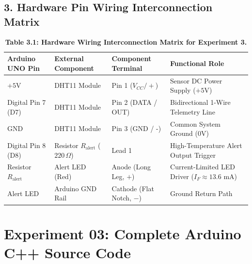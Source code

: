 \documentclass[10pt,a4paper]{article}
\begin{document}
\subsection*{3. Hardware Pin Wiring Interconnection Matrix}
\begin{table}[H]
\centering
\small
\renewcommand{\arraystretch}{1.22}
\begin{tabularx}{\textwidth}{|l|l|l|X|}
\hline
\textbf{Arduino UNO Pin} & \textbf{External Component} & \textbf{Component Terminal} & \textbf{Functional Role} \\
\hline
$+5\text{V}$ & DHT11 Module & Pin 1 ($V_{CC} / +$) & Sensor DC Power Supply ($+5\text{V}$) \\
Digital Pin 7 (D7) & DHT11 Module & Pin 2 (DATA / OUT) & Bidirectional 1-Wire Telemetry Line \\
GND & DHT11 Module & Pin 3 (GND / -) & Common System Ground ($0\text{V}$) \\
\hline
Digital Pin 8 (D8) & Resistor $R_{\text{alert}}$ ($220\,\Omega$) & Lead 1 & High-Temperature Alert Output Trigger \\
Resistor $R_{\text{alert}}$ & Alert LED (Red) & Anode (Long Leg, $+$) & Current-Limited LED Driver ($I_F \approx 13.6\text{ mA}$) \\
Alert LED & Arduino GND Rail & Cathode (Flat Notch, $-$) & Ground Return Path \\
\hline
\end{tabularx}
\caption{\textbf{Table 3.1: Hardware Wiring Interconnection Matrix for Experiment 3.}}
\end{table}

\newpage

\section*{Experiment 03: Complete Arduino C++ Source Code}
\end{document}
